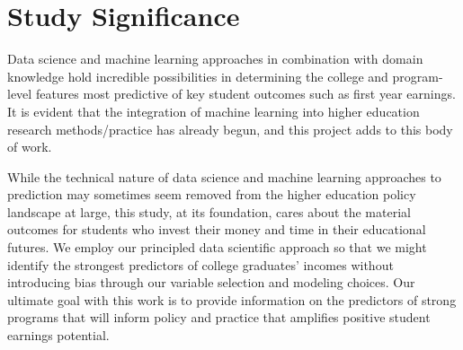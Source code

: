 \documentclass[a4paper, 12pt]{article}
\begin{document}
\section*{Study Significance}

Data science and machine learning approaches in combination with domain knowledge hold incredible possibilities in determining the college and program-level features most predictive of key student outcomes such as first year earnings. It is evident that the integration of machine learning into higher education research methods/practice has already begun, and this project adds to this 
body of work.

While the technical nature of data science and machine learning approaches to prediction may sometimes seem removed from the higher education policy landscape at large, this study, at its foundation, cares about the material outcomes for students who invest their money and time in their educational futures. We employ our principled data scientific approach so that we might identify the strongest predictors of college graduates' incomes without introducing bias through our variable selection and modeling choices. Our ultimate goal with this work is to provide information on the predictors of strong programs that will inform policy and practice that amplifies positive student earnings potential.

\pagebreak
{}
\setlength{} 
\printbibliography
\end{document}
